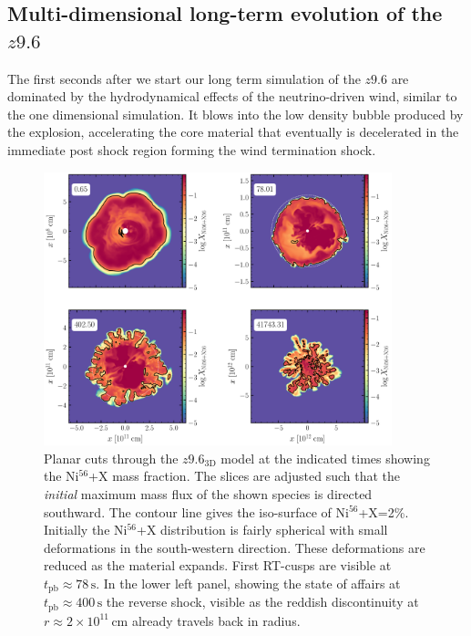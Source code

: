 \documentclass[fleqn,usenatbib]{mnras}
\newcommand{\nickel}{$\mathrm{Ni^{56}}$\xspace}
\newcommand{\tracer}{$\mathrm{X}$\xspace}
\begin{document}
\subsection{Multi-dimensional long-term evolution of the $z9.6$}
\label{sec:Multidimensional long term evolution of the z9.6}
The first seconds after we start our long term simulation of the $z9.6$ are dominated by the hydrodynamical effects of the neutrino-driven wind, similar to the one dimensional simulation. It blows into the low density bubble produced by the explosion, accelerating the core material that eventually is decelerated in the immediate post shock region forming the wind termination shock. 

\iffalse
\begin{figure}
 \centering
 \includegraphics[width=0.9\textwidth]{pic/species_cuts_z9_3d_4times.pdf}
 \caption{Planar cuts through the $z9.6_{\mathrm{3D}}$ model at the indicated times showing the \nickel+\tracer mass fraction. The slices are adjusted such that the \textit{initial} maximum mass flux of the shown species is directed southward. The contour line gives the iso-surface of \nickel+\tracer=2\%. Initially the \nickel+\tracer distribution is fairly spherical with small deformations in the south-western direction. These deformations are reduced as the material expands. First RT-cusps are visible at $t_{\mathrm{pb}}\approx 78\,\text{s}$. In the lower left panel, showing the state of affairs at  $t_{\mathrm{pb}}\approx 400\,\text{s}$ the reverse shock, visible as the reddish discontinuity at $r\approx 2\times 10^{11}\,\mathrm{cm}$ already travels back in radius. }
 \label{fig:z9_3d_species_4times}
\end{figure}
\end{document}
